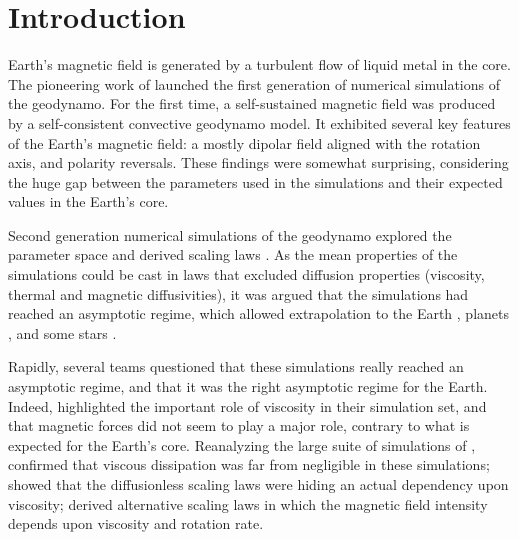 \documentclass[12pt, a4paper]{article}
\begin{document}
\tableofcontents
\newpage

\section{Introduction}

Earth's magnetic field is generated by a turbulent flow of liquid metal in the core.
The pioneering work of \citet{glatzmaier1995} launched the first generation of numerical simulations of the geodynamo.
For the first time, a self-sustained magnetic field was produced by a self-consistent convective geodynamo model.
It exhibited several key features of the Earth's magnetic field: a mostly dipolar field aligned with the rotation axis, and polarity reversals.
These findings were somewhat surprising, considering the huge gap between
the parameters used in the simulations and their expected values in the
Earth's core.

Second generation numerical simulations of the geodynamo explored the parameter space and derived scaling laws \citep{christensen2006}.
As the mean properties of the simulations could be cast in laws that excluded diffusion properties (viscosity, thermal and magnetic diffusivities), it was argued that the simulations had reached an asymptotic regime, which allowed extrapolation to the Earth \citep{christensen2010}, planets \citep{christensen2010b}, and some stars \citep{christensen2009}.

Rapidly, several teams questioned that these simulations really reached an asymptotic regime, and that it was the right asymptotic regime for the Earth.
Indeed, \citet{soderlund2012} highlighted the important role of viscosity in their simulation set, and that magnetic forces did not seem to play a major role, contrary to what is expected for the Earth's core.
Reanalyzing the large suite of simulations of \citet{christensen2006}, \citet{king2013} confirmed that viscous dissipation was far from negligible in these simulations;
\citet{cheng2016} showed that the diffusionless scaling laws were hiding an actual dependency upon viscosity;
\citet{oruba2014} derived alternative scaling laws in which the magnetic field intensity depends upon viscosity and rotation rate.
\end{document}
